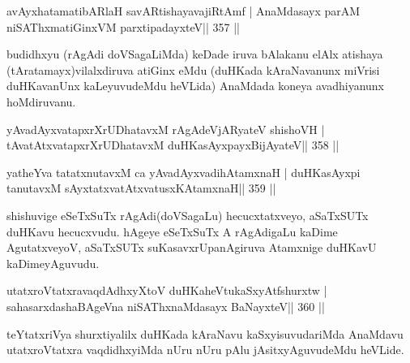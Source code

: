 \begin{shl}
avAyxhatamatibARlaH savARtishayavajiRtAmf |
AnaMdasayx parAM niSAThxmatiGinxVM parxtipadayxteV\hfill || 357 ||
\end{shl}

\begin{artha}
budidhxyu (rAgAdi doVSagaLiMda) keDade iruva bAlakanu elAlx atishaya (tAratamayx)vilalxdiruva atiGinx eMdu (duHKada kAraNavanunx miVrisi duHKavanUnx kaLeyuvudeMdu heVLida) AnaMdada koneya avadhiyanunx hoMdiruvanu.
\end{artha}


\begin{shl}
yAvadAyxvatapxrXrUDhatavxM rAgAdeVjARyateV shishoVH |
tAvatAtxvatapxrXrUDhatavxM duHKasAyxpayxBijAyateV\hfill || 358 ||
\end{shl}

\begin{shl}
yatheYva tatatxnutavxM ca yAvadAyxvadihA\s\s tamxnaH |
duHKasAyxpi tanutavxM sAyxtatxvatAtxvatusxKAtamxnaH\hfill || 359 ||
\end{shl}

\begin{artha}
shishuvige eSeTxSuTx rAgAdi(doVSagaLu) hecucxtatxveyo, aSaTxSUTx 
duHKavu hecucxvudu. hAgeye eSeTxSuTx A rAgAdigaLu kaDime AgutatxveyoV, 
aSaTxSUTx suKasavxrUpanAgiruva Atamxnige duHKavU kaDimeyAguvudu. 
\end{artha}


\begin{shl}
utatxroVtatxravaqdAdhxyX\s toV duHKaheVtukaSxyAtfshurxtw |
\footnotemark[1]sahasarxdashaBAgeVna niSAThx\s\s naMdasayx BaNayxteV\hfill || 360 ||
\end{shl}

\begin{artha}
teYtatxriVya shurxtiyalilx duHKada kAraNavu kaSxyisuvudariMda AnaMdavu utatxroVtatxra vaqdidhxyiMda nUru nUru pAlu jAsitxyAguvudeMdu heVLide.
\end{artha}

